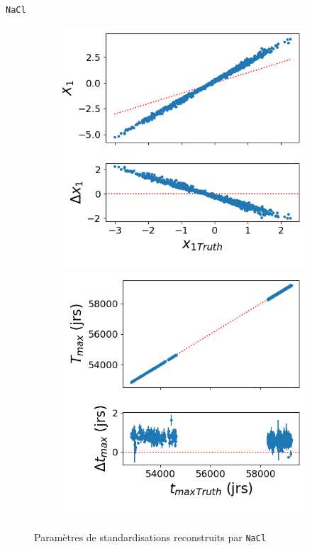 \documentclass{beamer}
\def\nacl{\texttt{NaCl}\xspace}
\begin{document}
\begin{frame}{\nacl}
\begin{figure}
\begin{subfigure}{0.49\textwidth}
	\end{subfigure}
	\begin{subfigure}{0.49\textwidth}
		\centering
		\includegraphics[height=.45\textheight]{figures/nacl_x1.png}
		\includegraphics[height=.45\textheight]{figures/nacl_tmax.png}
	\end{subfigure}
	\caption{Paramètres de standardisations reconstruits par \nacl}
\end{figure}
\end{frame}
\end{document}
